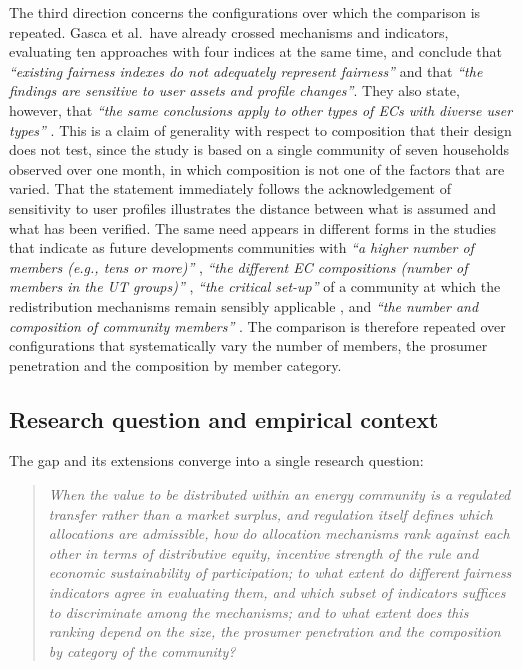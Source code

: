 The third direction concerns the configurations over which the comparison is repeated. Gasca et al.\ have already crossed mechanisms and indicators, evaluating ten approaches with four indices at the same time, and conclude that \textit{``existing fairness indexes do not adequately represent fairness''} and that \textit{``the findings are sensitive to user assets and profile changes''}. They also state, however, that \textit{``the same conclusions apply to other types of ECs with diverse user types''} \cite{gasca2024}. This is a claim of generality with respect to composition that their design does not test, since the study is based on a single community of seven households observed over one month, in which composition is not one of the factors that are varied. That the statement immediately follows the acknowledgement of sensitivity to user profiles illustrates the distance between what is assumed and what has been verified. The same need appears in different forms in the studies that indicate as future developments communities with \textit{``a higher number of members (e.g., tens or more)''} \cite{volpato2024}, \textit{``the different EC compositions (number of members in the UT groups)''} \cite{minutoLanzini2022}, \textit{``the critical set-up''} of a community at which the redistribution mechanisms remain sensibly applicable \cite{fina2024}, and \textit{``the number and composition of community members''} \cite{giudice2026}. The comparison is therefore repeated over configurations that systematically vary the number of members, the prosumer penetration and the composition by member category.

\subsection*{Research question and empirical context}

The gap and its extensions converge into a single research question:

\begin{quote}
\emph{When the value to be distributed within an energy community is a regulated transfer rather than a market surplus, and regulation itself defines which allocations are admissible, how do allocation mechanisms rank against each other in terms of distributive equity, incentive strength of the rule and economic sustainability of participation; to what extent do different fairness indicators agree in evaluating them, and which subset of indicators suffices to discriminate among the mechanisms; and to what extent does this ranking depend on the size, the prosumer penetration and the composition by category of the community?}
\end{quote}

